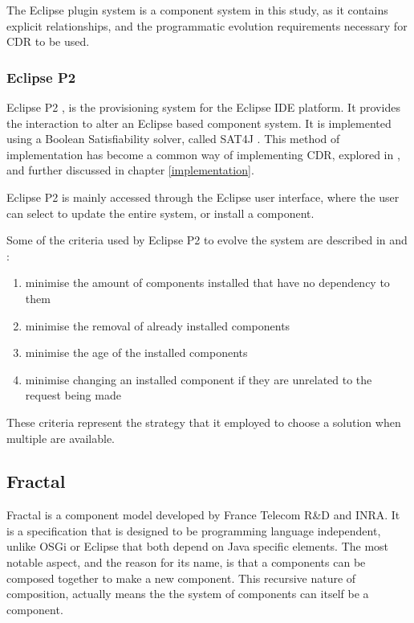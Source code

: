 The Eclipse plugin system is a component system in this study, 
as it contains explicit relationships, and the programmatic evolution requirements necessary for CDR to be used.

\subsubsection{Eclipse P2}
Eclipse P2 \cite{le_berre_dependency_2009}, \cite{leBerre2010} is the provisioning system for the Eclipse IDE platform.
It provides the interaction to alter an Eclipse based component system. 
It is implemented using a Boolean Satisfiability solver, called SAT4J \cite{le2010sat4j}.
This method of implementation has become a common way of implementing CDR, explored in \cite{Berre2008}, and further discussed in chapter \ref{implementation}.

Eclipse P2 is mainly accessed through the Eclipse user interface, where the user can select to update the entire system, or install a component.

Some of the criteria used by Eclipse P2 to evolve the system are described in \cite{le_berre_dependency_2009} and \cite{leBerre2010}:
\begin{enumerate}
  \item minimise the amount of components installed that have no dependency to them 
  \item minimise the removal of already installed components
  \item minimise the age of the installed components
  \item minimise changing an installed component if they are unrelated to the request being made
\end{enumerate} 

These criteria represent the strategy that it employed to choose a solution when multiple are available. 

\subsection{Fractal}
Fractal is a component model developed by France Telecom R\&D and INRA.
It is a specification that is designed to be programming language independent, unlike OSGi or Eclipse that both depend on Java specific elements.
The most notable aspect, and the reason for its name, is that a components can be composed together to make a new component.
This recursive nature of composition, actually means the the system of components can itself be a component.


